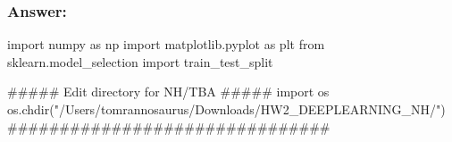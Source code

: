\documentclass[
  letterpaper,
  DIV=11,
  numbers=noendperiod]{scrartcl}
\newenvironment{Shaded}{\begin{snugshade}}{\end{snugshade}}
\newcommand{\CommentTok}[1]{\textcolor[rgb]{0.37,0.37,0.37}{#1}}
\newcommand{\ImportTok}[1]{\textcolor[rgb]{0.00,0.46,0.62}{#1}}
\newcommand{\NormalTok}[1]{\textcolor[rgb]{0.00,0.23,0.31}{#1}}
\newcommand{\StringTok}[1]{\textcolor[rgb]{0.13,0.47,0.30}{#1}}
\begin{document}
\subsubsection{Answer:}\label{answer}

\begin{Shaded}
\begin{Highlighting}[]
\ImportTok{import}\NormalTok{ numpy }\ImportTok{as}\NormalTok{ np}
\ImportTok{import}\NormalTok{ matplotlib.pyplot }\ImportTok{as}\NormalTok{ plt}
\ImportTok{from}\NormalTok{ sklearn.model\_selection }\ImportTok{import}\NormalTok{ train\_test\_split}

\CommentTok{\#\#\#\#\# Edit directory for NH/TBA \#\#\#\#\#}
\ImportTok{import}\NormalTok{ os}
\NormalTok{os.chdir(}\StringTok{"/Users/tomrannosaurus/Downloads/HW2\_DEEPLEARNING\_NH/"}\NormalTok{)}
\CommentTok{\#\#\#\#\#\#\#\#\#\#\#\#\#\#\#\#\#\#\#\#\#\#\#\#\#\#\#\#\#\#\#}
\end{Highlighting}
\end{Shaded}
\end{document}
